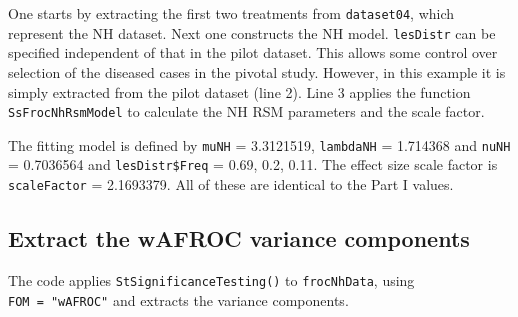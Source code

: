 \documentclass[
]{book}
\newenvironment{Shaded}{\begin{snugshade}}{\end{snugshade}}
\newcommand{\AttributeTok}[1]{\textcolor[rgb]{0.77,0.63,0.00}{#1}}
\newcommand{\CommentTok}[1]{\textcolor[rgb]{0.56,0.35,0.01}{\textit{#1}}}
\newcommand{\DecValTok}[1]{\textcolor[rgb]{0.00,0.00,0.81}{#1}}
\newcommand{\FunctionTok}[1]{\textcolor[rgb]{0.00,0.00,0.00}{#1}}
\newcommand{\NormalTok}[1]{#1}
\newcommand{\OtherTok}[1]{\textcolor[rgb]{0.56,0.35,0.01}{#1}}
\newcommand{\SpecialCharTok}[1]{\textcolor[rgb]{0.00,0.00,0.00}{#1}}
\begin{document}
One starts by extracting the first two treatments from \texttt{dataset04}, which represent the NH dataset. Next one constructs the NH model. \texttt{lesDistr} can be specified independent of that in the pilot dataset. This allows some control over selection of the diseased cases in the pivotal study. However, in this example it is simply extracted from the pilot dataset (line 2). Line 3 applies the function \texttt{SsFrocNhRsmModel} to calculate the NH RSM parameters and the scale factor.

\begin{Shaded}
\end{Shaded}

The fitting model is defined by \texttt{muNH} = 3.3121519, \texttt{lambdaNH} = 1.714368 and \texttt{nuNH} = 0.7036564 and \texttt{lesDistr\$Freq} = 0.69, 0.2, 0.11. The effect size scale factor is \texttt{scaleFactor} = 2.1693379. All of these are identical to the Part I values.

\hypertarget{froc-sample-size-variance-components}{%
\subsection{Extract the wAFROC variance components}\label{froc-sample-size-variance-components}}

The code applies \texttt{StSignificanceTesting()} to \texttt{frocNhData}, using \texttt{FOM\ =\ "wAFROC"} and extracts the variance components.
\end{document}
